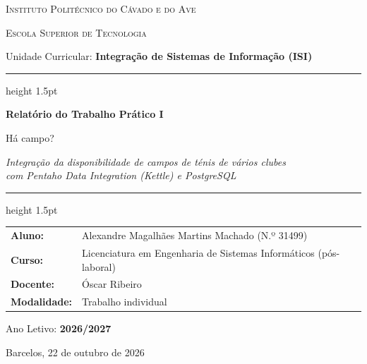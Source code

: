 \documentclass[11pt,a4paper]{article}
\newcommand{\anoLetivo}{2026/2027}
\newcommand{\alunoNome}{Alexandre Magalhães Martins Machado}
\newcommand{\alunoNum}{31499}
\newcommand{\docente}{Óscar Ribeiro}
\newcommand{\dataEntrega}{22 de outubro de 2026}
\begin{document}
\begin{titlepage}
    \centering
    \vspace*{0.5cm}

    {\scshape\Large Instituto Politécnico do Cávado e do Ave\par}
    {\scshape\large Escola Superior de Tecnologia\par}
    \vspace{0.3cm}
    {\large Unidade Curricular: \textbf{Integração de Sistemas de Informação (ISI)}\par}

    \vspace{1.8cm}
    \hrule height 1.5pt
    \vspace{0.4cm}
    {\huge\bfseries Relatório do Trabalho Prático I\par}
    \vspace{0.3cm}
    {\LARGE Há campo?\par}
    \vspace{0.2cm}
    {\large\textit{Integração da disponibilidade de campos de ténis de vários clubes\\com Pentaho Data Integration (Kettle) e PostgreSQL}\par}
    \vspace{0.4cm}
    \hrule height 1.5pt
    \vspace{1.5cm}

    \begin{tcolorbox}[colback=gray!5!white,colframe=gray!50!black,arc=2mm,title=\textbf{Identificação}]
        \centering
        \begin{tabular}{ll}
            \textbf{Aluno:} & \alunoNome{} (N.º \alunoNum) \\
            \textbf{Curso:} & Licenciatura em Engenharia de Sistemas Informáticos (pós-laboral) \\
            \textbf{Docente:} & \docente \\
            \textbf{Modalidade:} & Trabalho individual \\
        \end{tabular}
    \end{tcolorbox}

    \vfill

    {\large Ano Letivo: \textbf{\anoLetivo}\par}
    \vspace{0.5cm}
    {\small Barcelos, \dataEntrega\par}
\end{titlepage}
\end{document}
